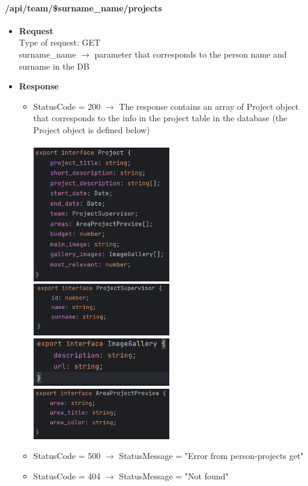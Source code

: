 \documentclass[11pt, letterpaper]{article}
\begin{document}
\paragraph{/api/team/\$surname\_name/projects}
\begin{itemize}
    \item \textbf{Request} \\ Type of request: GET \\ surname\_name $\rightarrow$ parameter that corresponds to the person name and surname in the DB  
    \item \textbf{Response} \begin{itemize}
        \item StatusCode = 200 $\rightarrow$ The response contains an array of Project object that corresponds to the info in the project table in the database (the Project object is defined below)\\ \\
            \includegraphics[width=6cm]{images/API/Project.png} \includegraphics[width=6cm]{images/API/ProjectSuperv.png} \\ \includegraphics[width=6cm]{images/API/ImageGallery.png} \includegraphics[width=6cm]{images/API/AreaPreview.png}
        \item StatusCode = 500 $\rightarrow$ StatusMessage = "Error from person-projects get"
        \item StatusCode = 404 $\rightarrow$ StatusMessage = "Not found"
    \end{itemize} 
\end{itemize}
\end{document}
